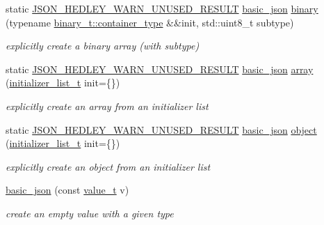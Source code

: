 \begin{DoxyCompactItemize}
static \hyperlink{json_8hpp_a28d7e3b2d26bd5b8a3806da3db7dea03}{J\+S\+O\+N\+\_\+\+H\+E\+D\+L\+E\+Y\+\_\+\+W\+A\+R\+N\+\_\+\+U\+N\+U\+S\+E\+D\+\_\+\+R\+E\+S\+U\+LT} \hyperlink{classnlohmann_1_1basic__json}{basic\+\_\+json} \hyperlink{classnlohmann_1_1basic__json_a012e375f4016b89444c528ed46cce3af}{binary} (typename \hyperlink{classnlohmann_1_1byte__container__with__subtype_a4d27e8633c5a5e3b49dd4ccb06515713}{binary\+\_\+t\+::container\+\_\+type} \&\&init, std\+::uint8\+\_\+t subtype)
\begin{DoxyCompactList}\small\item\em explicitly create a binary array (with subtype) \end{DoxyCompactList}\item 
static \hyperlink{json_8hpp_a28d7e3b2d26bd5b8a3806da3db7dea03}{J\+S\+O\+N\+\_\+\+H\+E\+D\+L\+E\+Y\+\_\+\+W\+A\+R\+N\+\_\+\+U\+N\+U\+S\+E\+D\+\_\+\+R\+E\+S\+U\+LT} \hyperlink{classnlohmann_1_1basic__json}{basic\+\_\+json} \hyperlink{classnlohmann_1_1basic__json_a2c8d8f5741aedadac8f3bffd8f2ce13e}{array} (\hyperlink{classnlohmann_1_1basic__json_a4d392f594e4c32345d47c2a175aad5c8}{initializer\+\_\+list\+\_\+t} init=\{\})
\begin{DoxyCompactList}\small\item\em explicitly create an array from an initializer list \end{DoxyCompactList}\item 
static \hyperlink{json_8hpp_a28d7e3b2d26bd5b8a3806da3db7dea03}{J\+S\+O\+N\+\_\+\+H\+E\+D\+L\+E\+Y\+\_\+\+W\+A\+R\+N\+\_\+\+U\+N\+U\+S\+E\+D\+\_\+\+R\+E\+S\+U\+LT} \hyperlink{classnlohmann_1_1basic__json}{basic\+\_\+json} \hyperlink{classnlohmann_1_1basic__json_a9a4df356e05415438fadf8a15e583903}{object} (\hyperlink{classnlohmann_1_1basic__json_a4d392f594e4c32345d47c2a175aad5c8}{initializer\+\_\+list\+\_\+t} init=\{\})
\begin{DoxyCompactList}\small\item\em explicitly create an object from an initializer list \end{DoxyCompactList}\item 
\hyperlink{classnlohmann_1_1basic__json_a19734fbc9c97d536832892ddacd6b62a}{basic\+\_\+json} (const \hyperlink{namespacenlohmann_1_1detail_a1ed8fc6239da25abcaf681d30ace4985}{value\+\_\+t} v)
\begin{DoxyCompactList}\small\item\em create an empty value with a given type \end{DoxyCompactList}\item 

\end{DoxyCompactItemize}
